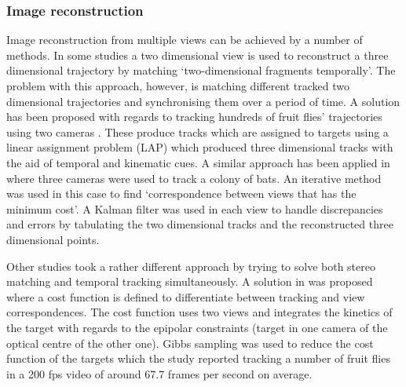 \subsubsection{Image reconstruction}
Image reconstruction from multiple views can be achieved by a number of methods. In some studies a two dimensional view is used to reconstruct a three dimensional trajectory by matching \lq two-dimensional fragments temporally\rq\cite{ardekani2012three}. The problem with this approach, however, is matching different tracked two dimensional trajectories and synchronising them over a period of time. A solution has been proposed with regards to tracking hundreds of fruit flies' trajectories using two cameras \cite{wu2011automated}. These produce tracks which are assigned to targets using a linear assignment problem (LAP) which produced three dimensional tracks with the aid of temporal and kinematic cues. A similar approach has been applied in \cite{wu2011automated} where three cameras were used to track a colony of bats. An iterative method was used in this case to find \lq correspondence between views that has the minimum cost\rq\cite{ardekani2012three}. A Kalman filter was used in each view to handle discrepancies and errors by tabulating the two dimensional tracks and the reconstructed three dimensional points.

Other studies took a rather different approach by trying to solve both stereo matching and temporal tracking simultaneously. A solution in \cite{zou2009reconstructing} was proposed where a cost function is defined to differentiate between tracking and view correspondences. The cost function uses two views and integrates the kinetics of the target with regards to the epipolar constraints (target in one camera of the optical centre of the other one). Gibbs sampling was used to reduce the cost function of the targets which the study reported tracking a number of fruit flies in a 200 fps video of around 67.7 frames per second on average. 

